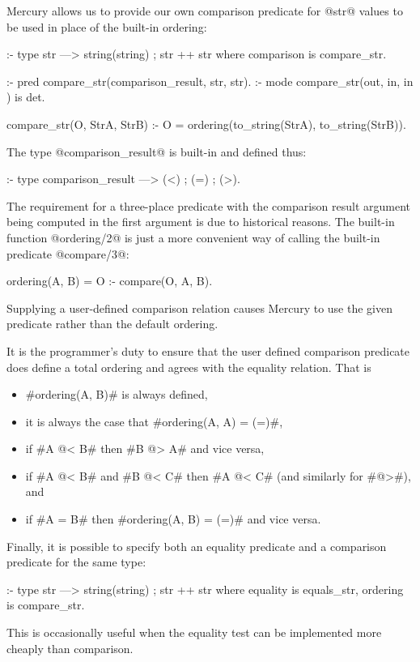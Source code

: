 Mercury allows us to provide our own comparison predicate for @str@ values
to be used in place of the built-in ordering:
\begin{myverbatim}
:- type str ---> string(string) ; str ++ str
    where comparison is compare_str.

:- pred compare_str(comparison_result, str, str).
:- mode compare_str(out,               in,  in ) is det.

compare_str(O, StrA, StrB) :-
    O = ordering(to_string(StrA), to_string(StrB)).
\end{myverbatim}
The type @comparison_result@ is built-in and defined thus:
\begin{myverbatim}
:- type comparison_result ---> (<) ; (=) ; (>).
\end{myverbatim}
The requirement for a three-place predicate with the comparison result
argument being computed in the first argument is due to historical reasons.
The built-in function @ordering/2@ is just a more convenient way of calling
the built-in predicate @compare/3@:
\begin{myverbatim}
ordering(A, B) = O :-
    compare(O, A, B).
\end{myverbatim}
Supplying a user-defined comparison relation causes Mercury to use the
given predicate rather than the default ordering.

It is the programmer's duty to ensure that the user defined comparison
predicate does define a total ordering and agrees with the equality
relation.
That is
\begin{itemize}
\item #ordering(A, B)# is always defined,
\item it is always the case that #ordering(A, A) = (=)#,
\item if #A @< B# then #B @> A# and vice versa,
\item if #A @< B# and #B @< C# then #A @< C# (and similarly for #@>#), and
\item if #A = B# then #ordering(A, B) = (=)# and vice versa.
\end{itemize}

Finally, it is possible to specify both an equality predicate and a
comparison predicate for the same type:
\begin{myverbatim}
:- type str ---> string(string) ; str ++ str
    where equality is equals_str, ordering is compare_str.
\end{myverbatim}
This is occasionally useful when the equality test can be implemented more
cheaply than comparison.

